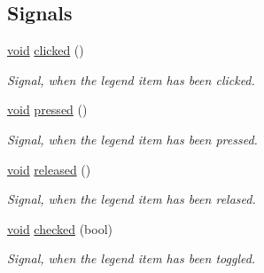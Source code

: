 \subsection*{Signals}
\begin{DoxyCompactItemize}
\item 
\hyperlink{group___u_a_v_objects_plugin_ga444cf2ff3f0ecbe028adce838d373f5c}{void} \hyperlink{class_qwt_legend_item_a28c4837ec402725c87ecee6de558c956}{clicked} ()
\begin{DoxyCompactList}\small\item\em Signal, when the legend item has been clicked. \end{DoxyCompactList}\item 
\hyperlink{group___u_a_v_objects_plugin_ga444cf2ff3f0ecbe028adce838d373f5c}{void} \hyperlink{class_qwt_legend_item_a7cc6a0390cc0aaea2feb8a324139410c}{pressed} ()
\begin{DoxyCompactList}\small\item\em Signal, when the legend item has been pressed. \end{DoxyCompactList}\item 
\hyperlink{group___u_a_v_objects_plugin_ga444cf2ff3f0ecbe028adce838d373f5c}{void} \hyperlink{class_qwt_legend_item_a7286b8900294659d0850ac588aafaa97}{released} ()
\begin{DoxyCompactList}\small\item\em Signal, when the legend item has been relased. \end{DoxyCompactList}\item 
\hyperlink{group___u_a_v_objects_plugin_ga444cf2ff3f0ecbe028adce838d373f5c}{void} \hyperlink{class_qwt_legend_item_a95fe5b1ec7fcfaa86fd9ec49a3bf23aa}{checked} (bool)
\begin{DoxyCompactList}\small\item\em Signal, when the legend item has been toggled. \end{DoxyCompactList}\end{DoxyCompactItemize}
